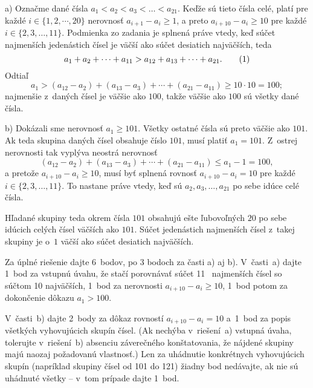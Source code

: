 {%
a) Označme dané čísla $a_1<a_2<a_3<\dots<a_{21}$. Keďže sú tieto čísla celé, platí pre každé $i\in\{1,2,\cdots,20\}$ nerovnosť $a_{i+1}-a_i\ge1$, a preto $a_{i+10}-a_i\ge10$ pre každé $i\in\{2,3,\dots,11\}$.
Podmienka zo zadania je splnená práve vtedy, keď súčet najmenších jedenástich čísel je väčší ako súčet desiatich najväčších, teda
$$
a_1+a_2+\cdots+a_{11}>a_{12}+a_{13}+\cdots+a_{21}.\tag1
$$
Odtiaľ
$$
a_1>(a_{12}-a_2)+(a_{13}-a_3)+\cdots+(a_{21}-a_{11})\ge10\cdot10=100;
$$
najmenšie z~daných čísel je väčšie ako $100$, takže väčšie ako $100$ sú všetky dané čísla.

\smallskip
b) Dokázali sme nerovnosť $a_1\ge101$. Všetky ostatné čísla sú preto väčšie ako $101$. Ak teda skupina daných čísel obsahuje číslo $101$, musí platiť $a_1=101$. Z~ostrej nerovnosti  tak vyplýva neostrá nerovnosť
$$
(a_{12}-a_2)+(a_{13}-a_3)+\cdots+(a_{21}-a_{11})\le a_1-1=100,
$$
a pretože $a_{i+10}-a_i\ge10$, musí byť splnená rovnosť $a_{i+10}-a_i=10$ pre každé $i\in\{2,3,\dots,11\}$. To nastane práve vtedy, keď sú $a_2,a_3,\dots,a_{21}$ po sebe idúce celé čísla.

Hľadané skupiny teda okrem čísla $101$ obsahujú ešte ľubovoľných $20$ po sebe idúcich celých čísel väčších ako $101$. Súčet jedenástich najmenších čísel z~takej skupiny je o~$1$ väčší ako súčet desiatich najväčších.

\nobreak\medskip\petit\noindent
Za úplné riešenie dajte 6~bodov, po 3 bodoch za časti a) aj b). V~časti~a)
dajte 1~bod za vstupnú úvahu, že stačí porovnávať súčet 11~
najmenších čísel so súčtom 10 najväčších, 1~bod za nerovnosti
$a_{i+10}-a_i\ge10$, 1~bod potom za dokončenie dôkazu $a_1>100$.

V~časti~b) dajte 2~body za dôkaz rovností $a_{i+10}-a_i=10$
a~1~bod za popis všetkých vyhovujúcich skupín čísel. (Ak nechýba
v~riešení~a) vstupná úvaha, tolerujte v~riešení~b) absenciu
záverečného konštatovania, že nájdené skupiny majú naozaj
požadovanú vlastnosť.) Len za uhádnutie konkrétnych
vyhovujúcich skupín (napríklad skupiny čísel od 101 do 121) žiadny
bod nedávajte, ak nie sú uhádnuté všetky -- v~tom prípade
dajte 1~bod.
\endpetit
\bigbreak
}

